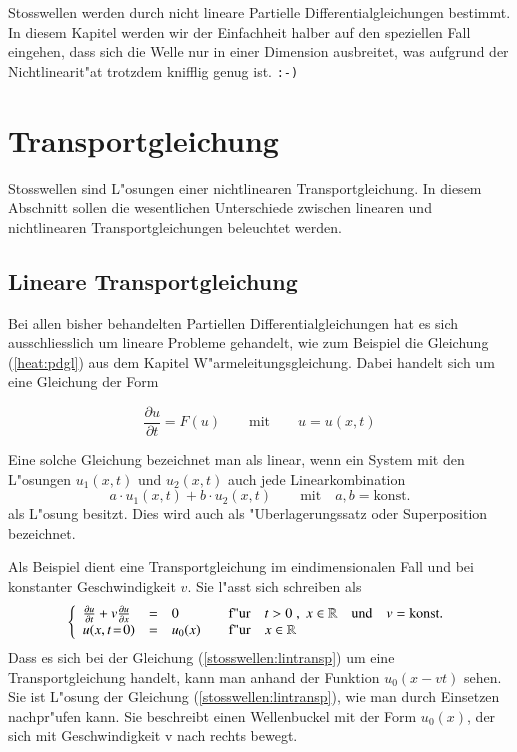 \begin{refsection}
Stosswellen werden durch nicht lineare Partielle Differentialgleichungen
bestimmt. In diesem Kapitel werden wir der Einfachheit halber auf den
speziellen Fall eingehen, dass sich die Welle nur in einer Dimension
ausbreitet, was aufgrund der Nichtlinearit"at trotzdem knifflig genug
ist. {\tt :-)}

\section{Transportgleichung}
Stosswellen sind L"osungen einer nichtlinearen Transportgleichung. In
diesem Abschnitt sollen die wesentlichen Unterschiede zwischen linearen
und nichtlinearen Transportgleichungen beleuchtet werden.

\subsection{Lineare Transportgleichung}
Bei allen bisher behandelten Partiellen Differentialgleichungen hat es
sich ausschliesslich um lineare Probleme gehandelt, wie zum Beispiel
die Gleichung (\ref{heat:pdgl}) aus dem Kapitel W"armeleitungsgleichung. 
Dabei handelt sich um eine Gleichung der Form

\begin{equation}
	\frac{\partial u}{\partial t}=F(u) \qquad \text{mit} \qquad u = u(x,t) 
	\label{stosswellen:lingl}
\end{equation}

Eine solche Gleichung bezeichnet man als linear, wenn ein System mit
den L"osungen
$u_{1}(x,t)$ und $u_{2}(x,t)$ auch jede Linearkombination
\begin{equation}
	a\cdot u_{1}(x,t) + b \cdot u_{2}(x,t) \qquad \text{mit} \quad a, b = \text{konst.}
	\label{stosswellen:linbed}
\end{equation}
als L"osung besitzt. Dies wird auch als "Uberlagerungssatz oder
Superposition bezeichnet.

Als Beispiel dient eine Transportgleichung im eindimensionalen Fall und bei konstanter Geschwindigkeit $v$. Sie l"asst sich schreiben als
\begin{equation}
	\left\{
	\begin{array}{lcl}
		\frac{\partial u}{\partial t} + v\frac{\partial u}{\partial x} &=& 0 \hspace{1.25cm} \text{f"ur} \quad t>0 \; , \; x \in \mathbb{R} \quad \text{und} \quad v=\text{konst.} \\
		u(x,t\!=\!0) &=& u_{0}(x) \qquad \text{f"ur} \quad x \in \mathbb{R} 
	\end{array} \right.
	\label{stosswellen:lintransp}
\end{equation}
Dass es sich bei der Gleichung (\ref{stosswellen:lintransp}) um eine
Transportgleichung handelt, kann man anhand der Funktion $u_0(x-vt)$
sehen. Sie ist L"osung der Gleichung (\ref{stosswellen:lintransp}),
wie man  durch  Einsetzen nachpr"ufen  kann.  Sie beschreibt einen
Wellenbuckel mit der Form $u_0(x)$, der sich mit Geschwindigkeit v nach
rechts bewegt.


\end{refsection}
